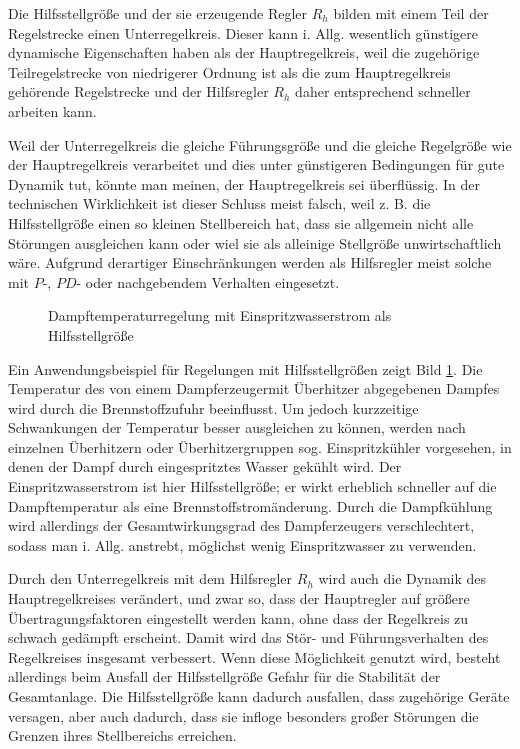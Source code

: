 Die Hilfsstellgröße und der sie erzeugende Regler \(R_h\) bilden mit einem Teil der Regelstrecke einen Unterregelkreis.
Dieser kann i. Allg. wesentlich günstigere dynamische Eigenschaften haben als der Hauptregelkreis, weil die zugehörige Teilregelstrecke von niedrigerer Ordnung ist als die zum Hauptregelkreis gehörende Regelstrecke und der Hilfsregler \(R_h\) daher entsprechend schneller arbeiten kann.

Weil der Unterregelkreis die gleiche Führungsgröße und die gleiche Regelgröße wie der Hauptregelkreis verarbeitet und dies unter günstigeren Bedingungen für gute Dynamik tut, könnte man meinen, der Hauptregelkreis sei überflüssig.
In der technischen Wirklichkeit ist dieser Schluss meist falsch, weil z. B. die Hilfsstellgröße einen so kleinen Stellbereich hat, dass sie allgemein nicht alle Störungen ausgleichen kann oder wiel sie als alleinige Stellgröße unwirtschaftlich wäre.
Aufgrund derartiger Einschränkungen werden als Hilfsregler meist solche mit \(P\)-, \(PD\)- oder nachgebendem Verhalten eingesetzt.

\begin{figure}[ht]
    \centering
    \caption{Dampftemperaturregelung mit Einspritzwasserstrom als Hilfsstellgröße}
    \label{fig:7-6}
\end{figure}

Ein Anwendungsbeispiel für Regelungen mit Hilfsstellgrößen zeigt Bild \ref{fig:7-6}.
Die Temperatur des von einem Dampferzeugermit Überhitzer abgegebenen Dampfes wird durch die Brennstoffzufuhr beeinflusst.
Um jedoch kurzzeitige Schwankungen der Temperatur besser ausgleichen zu können, werden nach einzelnen Überhitzern oder Überhitzergruppen sog. Einspritzkühler vorgesehen, in denen der Dampf durch eingespritztes Wasser gekühlt wird.
Der Einspritzwasserstrom ist hier Hilfsstellgröße; er wirkt erheblich schneller auf die Dampftemperatur als eine Brennstoffstromänderung.
Durch die Dampfkühlung wird allerdings der Gesamtwirkungsgrad des Dampferzeugers verschlechtert, sodass man i. Allg. anstrebt, möglichst wenig Einspritzwasser zu verwenden.

Durch den Unterregelkreis mit dem Hilfsregler \(R_h\) wird auch die Dynamik des Hauptregelkreises verändert, und zwar so, dass der Hauptregler auf größere Übertragungsfaktoren eingestellt werden kann, ohne dass der Regelkreis zu schwach gedämpft erscheint.
Damit wird das Stör- und Führungsverhalten des Regelkreises insgesamt verbessert.
Wenn diese Möglichkeit genutzt wird, besteht allerdings beim Ausfall der Hilfsstellgröße Gefahr für die Stabilität der Gesamtanlage.
Die Hilfsstellgröße kann dadurch ausfallen, dass zugehörige Geräte versagen, aber auch dadurch, dass sie infloge besonders großer Störungen die Grenzen ihres Stellbereichs erreichen.


